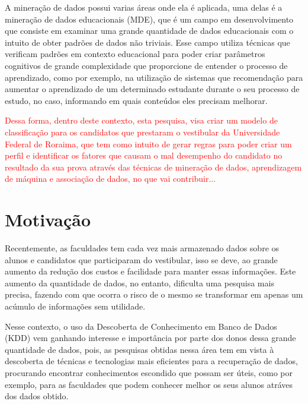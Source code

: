 \par
A mineração de dados possui varias áreas onde ela é aplicada, uma delas é a mineração de dados educacionais (MDE), que é um campo em desenvolvimento que consiste em examinar uma grande quantidade de dados educacionais com o intuito de obter padrões de dados não triviais. Esse campo utiliza técnicas que verificam padrões em contexto educacional para poder criar parâmetros cognitivos de grande complexidade que proporcione de entender o processo de aprendizado, como por exemplo, na utilização de sistemas que recomendação para aumentar o aprendizado de um determinado estudante durante o seu processo de estudo, no caso, informando em quais conteúdos eles precisam melhorar.

\par
\textcolor{red}{Dessa forma, dentro deste contexto, esta pesquisa, visa criar um modelo de classificação para os candidatos que prestaram o vestibular da Universidade Federal de Roraima,  que tem como intuito de gerar regras para poder criar um perfil e identificar os fatores que causam o mal desempenho do candidato no resultado da sua prova através das técnicas de mineração de dados, aprendizagem de máquina e associação de dados, no que vai contribuir...}







\section{Motivação}

Recentemente, as faculdades tem cada vez mais armazenado dados sobre os alunos e candidatos que participaram do vestibular, isso se deve, ao  grande aumento da redução dos custos e facilidade para manter essas informações. Este aumento da quantidade de dados, no entanto, dificulta uma pesquisa mais precisa, fazendo com que ocorra o risco de o mesmo se transformar em apenas um acúmulo de informações sem utilidade. 

\par
Nesse contexto, o uso da Descoberta de Conhecimento em Banco de Dados (KDD) vem ganhando interesse e importância por parte dos donos dessa grande quantidade de dados, pois, as pesquisas obtidas nessa área tem em vista à descoberta de técnicas e tecnologias mais eficientes para a recuperação de dados, procurando encontrar conhecimentos escondido que possam ser úteis, como por exemplo, para as faculdades que podem conhecer melhor os seus alunos atráves dos dados obtido.

